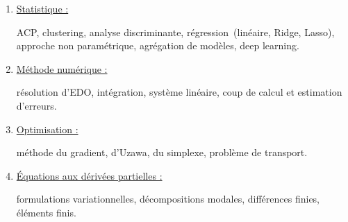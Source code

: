 \documentclass[12pt,a4paper]{article}
\newcommand{\taille}[3][10pt]{{\fontsize{#2}{#1}\selectfont #3}} %
\newcommand{\saut}[1][1cm]{\vspace{#1}} %
\begin{document}
\begin{minipage}{13cm}
		\vspace{-.5cm}
		
		\hspace*{-.55cm}
		\begin{minipage}[t]{12.8cm}
			\begin{spacing}{.5}	\setlength{\spaceskip}{0.2em}		
				\begin{enumerate}[label=$\star$\hspace{-.1cm}]
					\item \taille{10pt}{\underline{Statistique :}} 			\begin{minipage}[t]{10cm}\taille{9pt}{
							ACP, clustering, analyse discriminante, régression (linéaire, Ridge, Lasso), approche non paramétrique, agrégation de modèles, deep learning.}
					\end{minipage}	
					
					\item \taille{10pt}{\underline{Méthode numérique :}} 			\begin{minipage}[t]{8.8cm}\taille{9pt}{
							résolution d’EDO, intégration, système linéaire, coup de calcul et estimation d’erreurs.}
					\end{minipage}	
					
					\item \taille{10pt}{\underline{Optimisation :}} 			\begin{minipage}[t]{11cm}\taille{9pt}{
							méthode du gradient, d’Uzawa, du simplexe, problème de transport.}
					\end{minipage}	
					
					\item \taille{10pt}{\setlength{\spaceskip}{0.2em}\underline{Équations aux dérivées partielles :}} \begin{minipage}[t]{8.4cm}
						\taille{9pt}{
							formulations variationnelles, décompositions modales, différences finies, éléments finis.}
					\end{minipage}			
				\end{enumerate}
			\end{spacing}
		\end{minipage}
		
		\saut[.5cm]
		
		
		\begin{minipage}[t]{7.1cm}
			\begin{tcolorbox}[
				colframe=white,
				colback=orange!80,
				arc=3mm,
				boxrule=2pt,
				left=6pt,
				right=6pt,
				top=2pt,
				bottom=2pt
				]
				\begin{center}
					\blanc{\textbf{\taille{12pt}{FORMATIONS}}}
				\end{center}
			\end{tcolorbox}
			

\end{minipage}
\end{minipage}
\end{document}
